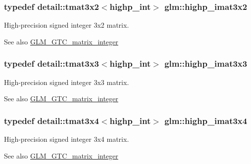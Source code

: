 \subsubsection[{highp\+\_\+imat3x2}]{\setlength{\rightskip}{0pt plus 5cm}typedef detail\+::tmat3x2$<$highp\+\_\+int$>$ {\bf glm\+::highp\+\_\+imat3x2}}\label{group__gtc__matrix__integer_gab33e4ccf70f2e1f2eae7c6ddfb594e3c}
High-\/precision signed integer 3x2 matrix. \begin{DoxySeeAlso}{See also}
\hyperlink{group__gtc__matrix__integer}{G\+L\+M\+\_\+\+G\+T\+C\+\_\+matrix\+\_\+integer} 
\end{DoxySeeAlso}
\hypertarget{group__gtc__matrix__integer_gaf44e40dda4b36c90b4a9210e7b936c93}{}
\subsubsection[{highp\+\_\+imat3x3}]{\setlength{\rightskip}{0pt plus 5cm}typedef detail\+::tmat3x3$<$highp\+\_\+int$>$ {\bf glm\+::highp\+\_\+imat3x3}}\label{group__gtc__matrix__integer_gaf44e40dda4b36c90b4a9210e7b936c93}
High-\/precision signed integer 3x3 matrix. \begin{DoxySeeAlso}{See also}
\hyperlink{group__gtc__matrix__integer}{G\+L\+M\+\_\+\+G\+T\+C\+\_\+matrix\+\_\+integer} 
\end{DoxySeeAlso}
\hypertarget{group__gtc__matrix__integer_gab0609d65fae60184ade419c6e4edc812}{}
\subsubsection[{highp\+\_\+imat3x4}]{\setlength{\rightskip}{0pt plus 5cm}typedef detail\+::tmat3x4$<$highp\+\_\+int$>$ {\bf glm\+::highp\+\_\+imat3x4}}\label{group__gtc__matrix__integer_gab0609d65fae60184ade419c6e4edc812}
High-\/precision signed integer 3x4 matrix. \begin{DoxySeeAlso}{See also}
\hyperlink{group__gtc__matrix__integer}{G\+L\+M\+\_\+\+G\+T\+C\+\_\+matrix\+\_\+integer} 
\end{DoxySeeAlso}
\hypertarget{group__gtc__matrix__integer_ga59980867b7f2a7ec595fbb283a555d4c}{}
